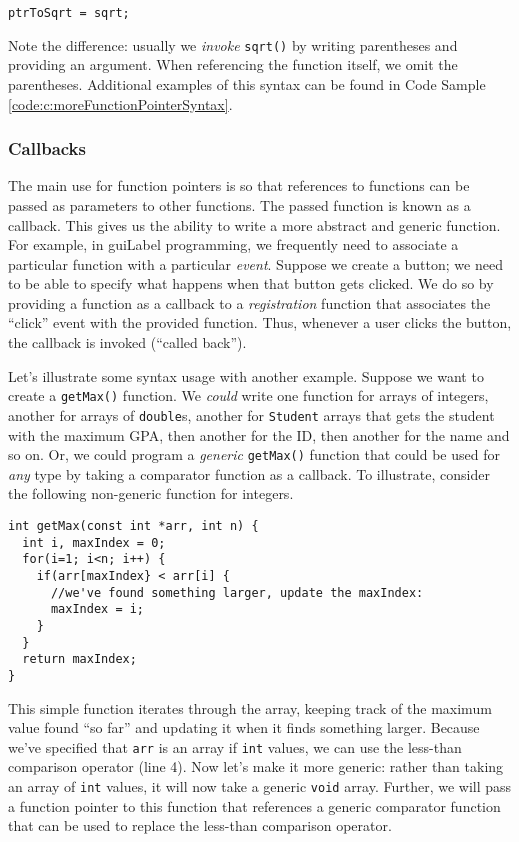 \texttt{ptrToSqrt = sqrt;}

Note the difference: usually we \emph{invoke} \texttt{sqrt()} by 
writing parentheses and providing an argument.  When referencing the
function itself, we omit the parentheses.  Additional examples 
of this syntax can be found in Code Sample \ref{code:c:moreFunctionPointerSyntax}.

\subsubsection{Callbacks}

The main use for function pointers is so that references to functions can be passed as parameters to other functions.  The passed function is known as a 
\gls{callback}.  This gives us the ability to write a more abstract and
generic function.  For example, in \gls{guiLabel} programming, we frequently need to associate
a particular function with a particular \emph{event}.  Suppose
we create a button; we need to be able to specify what happens when that
button gets clicked.  We do so by providing a function as a callback to
a \emph{registration} function that associates the ``click'' event with the
provided function.  Thus, whenever a user clicks the button, the callback
is invoked (``called back'').  

Let's illustrate some syntax usage with another example.  Suppose we want to 
create a \texttt{getMax()} function.  We \emph{could} write one 
function for arrays of integers, another for arrays of \texttt{double}s, 
another for \texttt{Student} arrays that gets the student with the
maximum GPA, then another for the ID, then another for the name and so on.  
Or, we could program a \emph{generic} \texttt{getMax()} function
that could be used for \emph{any} type by taking a comparator function as
a callback.  To illustrate, consider the following non-generic function for
integers.

\begin{verbatim}
int getMax(const int *arr, int n) {
  int i, maxIndex = 0;
  for(i=1; i<n; i++) {
    if(arr[maxIndex} < arr[i] {
      //we've found something larger, update the maxIndex:
      maxIndex = i;
    }
  }
  return maxIndex;
}
\end{verbatim}

This simple function iterates through the array, keeping track of the maximum
value found ``so far'' and updating it when it finds something larger.  Because
we've specified that \texttt{arr} is an array if \texttt{int}
values, we can use the less-than comparison operator (line 4).  Now let's make
it more generic: rather than taking an array of \texttt{int} values, 
it will now take a generic \texttt{void} array.  Further, we will
pass a function pointer to this function that references a generic comparator
function that can be used to replace the less-than comparison operator.

